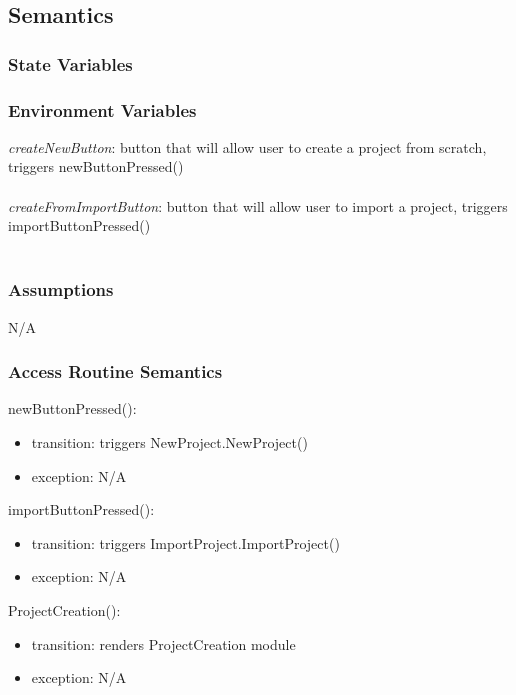 \documentclass[12pt, titlepage]{article}
\begin{document}
	\subsection{Semantics}
	
	\subsubsection{State Variables}
	
	\subsubsection{Environment Variables}
	
	\textit{createNewButton}: button that will allow user to create a project from scratch, triggers newButtonPressed() \\\\ 
	\textit{createFromImportButton}: button that will allow user to import a project, triggers importButtonPressed() \\\\
	
	\subsubsection{Assumptions}
	N/A
	
	\subsubsection{Access Routine Semantics}
	
	\noindent newButtonPressed():
	\begin{itemize}
		\item transition: triggers NewProject.NewProject()
		\item exception: N/A
	\end{itemize}
	\noindent importButtonPressed():
	\begin{itemize}
		\item transition: triggers ImportProject.ImportProject()
		\item exception: N/A
	\end{itemize}
	\noindent ProjectCreation():
	\begin{itemize}
		\item transition: renders ProjectCreation module
		\item exception: N/A
	\end{itemize}
	
\end{document}

